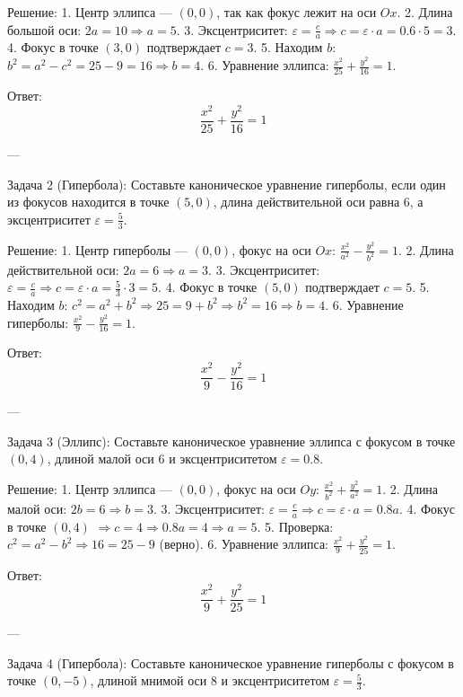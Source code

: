 \documentclass[a4paper,14pt]{extreport} %
\begin{document}
 Решение:   
1. Центр эллипса — \((0, 0)\), так как фокус лежит на оси \(Ox\).  
2. Длина большой оси: \(2a = 10 \Rightarrow a = 5\).  
3. Эксцентриситет: \(\varepsilon = \frac{c}{a} \Rightarrow c = \varepsilon \cdot a = 0.6 \cdot 5 = 3\).  
4. Фокус в точке \((3, 0)\) подтверждает \(c = 3\).  
5. Находим \(b\): \(b^2 = a^2 - c^2 = 25 - 9 = 16 \Rightarrow b = 4\).  
6. Уравнение эллипса: \(\frac{x^2}{25} + \frac{y^2}{16} = 1\).

 Ответ:   
\[
\boxed{\frac{x^2}{25} + \frac{y^2}{16} = 1}
\]

---

 Задача 2 (Гипербола):   
Составьте каноническое уравнение гиперболы, если один из фокусов находится в точке \((5, 0)\), длина действительной оси равна \(6\), а эксцентриситет \(\varepsilon = \frac{5}{3}\).

 Решение:   
1. Центр гиперболы — \((0, 0)\), фокус на оси \(Ox\): \(\frac{x^2}{a^2} - \frac{y^2}{b^2} = 1\).  
2. Длина действительной оси: \(2a = 6 \Rightarrow a = 3\).  
3. Эксцентриситет: \(\varepsilon = \frac{c}{a} \Rightarrow c = \varepsilon \cdot a = \frac{5}{3} \cdot 3 = 5\).  
4. Фокус в точке \((5, 0)\) подтверждает \(c = 5\).  
5. Находим \(b\): \(c^2 = a^2 + b^2 \Rightarrow 25 = 9 + b^2 \Rightarrow b^2 = 16 \Rightarrow b = 4\).  
6. Уравнение гиперболы: \(\frac{x^2}{9} - \frac{y^2}{16} = 1\).

 Ответ:   
\[
\boxed{\frac{x^2}{9} - \frac{y^2}{16} = 1}
\]

---

 Задача 3 (Эллипс):   
Составьте каноническое уравнение эллипса с фокусом в точке \((0, 4)\), длиной малой оси \(6\) и эксцентриситетом \(\varepsilon = 0.8\).

 Решение:   
1. Центр эллипса — \((0, 0)\), фокус на оси \(Oy\): \(\frac{x^2}{b^2} + \frac{y^2}{a^2} = 1\).  
2. Длина малой оси: \(2b = 6 \Rightarrow b = 3\).  
3. Эксцентриситет: \(\varepsilon = \frac{c}{a} \Rightarrow c = \varepsilon \cdot a = 0.8a\).  
4. Фокус в точке \((0, 4)\) \(\Rightarrow c = 4 \Rightarrow 0.8a = 4 \Rightarrow a = 5\).  
5. Проверка: \(c^2 = a^2 - b^2 \Rightarrow 16 = 25 - 9\) (верно).  
6. Уравнение эллипса: \(\frac{x^2}{9} + \frac{y^2}{25} = 1\).

 Ответ:   
\[
\boxed{\frac{x^2}{9} + \frac{y^2}{25} = 1}
\]

---

 Задача 4 (Гипербола):   
Составьте каноническое уравнение гиперболы с фокусом в точке \((0, -5)\), длиной мнимой оси \(8\) и эксцентриситетом \(\varepsilon = \frac{5}{3}\).
\end{document}
